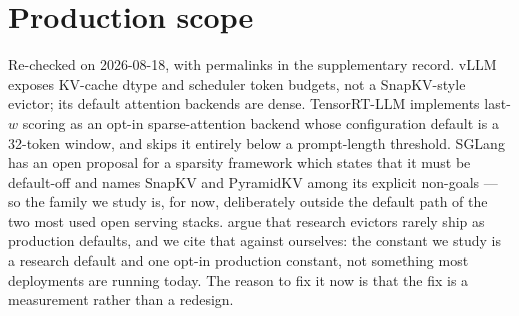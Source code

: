 \documentclass{article}
\begin{document}
\section{Production scope}
\label{app:prod}

Re-checked on 2026-08-18, with permalinks in the supplementary record.
vLLM exposes KV-cache dtype and scheduler token budgets, not a
SnapKV-style evictor; its default attention backends are dense.
TensorRT-LLM implements last-$w$ scoring as an opt-in sparse-attention
backend whose configuration default is a 32-token window, and skips it
entirely below a prompt-length threshold. SGLang has an open proposal for
a sparsity framework which states that it must be default-off and names
SnapKV and PyramidKV among its explicit non-goals --- so the family we
study is, for now, deliberately outside the default path of the two most
used open serving stacks.
\citet{nvidia2026efficient} argue that research evictors rarely ship as
production defaults, and we cite that against ourselves: the constant we
study is a research default and one opt-in production constant, not
something most deployments are running today. The reason to fix it now is
that the fix is a measurement rather than a redesign.
\end{document}

